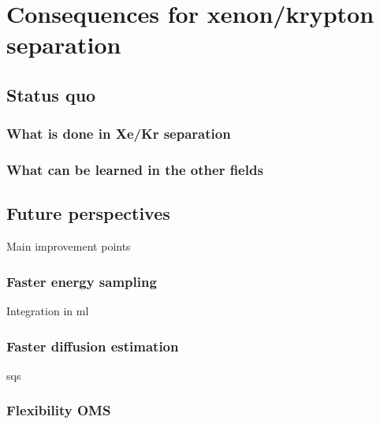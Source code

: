 \documentclass[main.tex]{subfiles}
\begin{document}
\section{Consequences for xenon/krypton separation}

\subsection{Status quo}

\subsubsection{What is done in Xe/Kr separation}

\subsubsection{What can be learned in the other fields}

\subsection{Future perspectives}

Main improvement points

\subsubsection{Faster energy sampling}
Integration in ml
\subsubsection{Faster diffusion estimation}
sqs
\subsubsection{Flexibility OMS}

\OnlyInSubfile{\printglobalbibliography}
\end{document}

